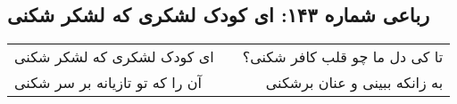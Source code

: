 \begin{center}
\section*{رباعی شماره ۱۴۳: ای کودک لشکری که لشکر شکنی}
\label{sec:143}
\begin{longtable}{l p{0.5cm} r}
ای کودک لشکری که لشکر شکنی
&&
تا کی دل ما چو قلب کافر شکنی؟
\\
آن را که تو تازیانه بر سر شکنی
&&
به زانکه ببینی و عنان برشکنی
\\
\end{longtable}
\end{center}
